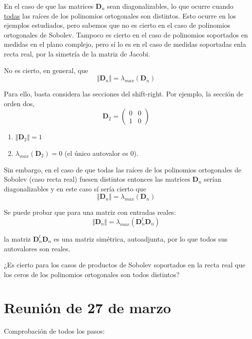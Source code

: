 \documentclass[11pt]{article}
\begin{document}
\noindent En el caso de que las matrices $\mathbf{D}_n$ sean diagonalizables, lo que ocurre cuando \underline{todas} las raíces de los polinomios ortogonales son distintos. Esto ocurre en los ejemplos estudiados, pero sabemos que no es cierto en el caso de polinomios ortogonales de Sobolev. Tampoco es cierto en el caso de polinomios soportados en medidas en el plano complejo, pero sí lo es en el caso de medidas soportadas enla recta real, por la simetría de la matriz de Jacobi.


\noindent No es cierto, en general, que
$$
  \Vert \mathbf{D}_n \Vert = \lambda_{max}(\mathbf{D}_n)
$$


\noindent Para ello, basta considera las secciones del shift-right. Por  ejemplo,
la sección de orden dos,
$$
  \mathbf{D}_2 = \begin{pmatrix} 0 & 0 \\ 1 & 0 \end{pmatrix}
$$

\begin{enumerate}
  \item $\Vert \mathbf{D}_2 \Vert =1 $
  \item $\lambda_{max}(\mathbf{D}_2)=0$ (el único autovalor es $0$).
\end{enumerate}



\noindent Sin embargo, en el caso de que todas las raíces de los polinomios ortogonales de Sobolev (caso recta real) fuesen distintos entonces las matrices $\mathbf{D}_n$ serían diagonalizables y en este caso sí sería cierto que
$$
  \Vert \mathbf{D}_n \Vert = \lambda_{max}(\mathbf{D}_n)
$$

\noindent Se puede probar que para una matriz con entradas reales:
$$
  \Vert \mathbf{D}_n \Vert= \lambda_{max}(\mathbf{D}_n^{t}\mathbf{D}_n)
$$

\noindent la matriz $\mathbf{D}_n^{t}\mathbf{D}_n$ es una matriz simétrica, autoadjunta, por lo que todos sus autovalores son reales.
\bigskip

 ¿Es cierto para los casos de productos de Sobolev soportados en la recta real que los ceros de los polinomios ortogonales son todos distintos?
\newpage

\section{Reunión de 27 de marzo}


\noindent Comprobación de todos los pasos:
\end{document}
